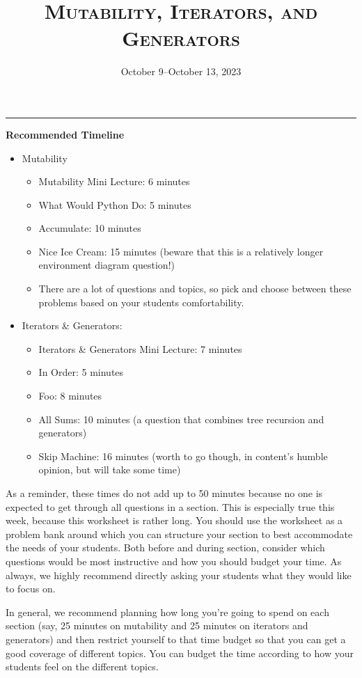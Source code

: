 \documentclass{exam}
\title{\textsc{Mutability, Iterators, and Generators}}
\date{October 9--October 13, 2023}
\begin{document}
\maketitle
\rule{\textwidth}{0.15em}


\begin{guide}
    \textbf{Recommended Timeline}
    \begin{itemize}
        \item Mutability
        \begin{itemize}
            \item Mutability Mini Lecture: 6 minutes
            \item What Would Python Do: 5 minutes
            \item Accumulate: 10 minutes
            \item Nice Ice Cream: 15 minutes (beware that this is a relatively longer environment diagram question!)
            \item There are a lot of questions and topics, so pick and choose between these problems based on your students comfortability.
        \end{itemize}
        \item Iterators \& Generators:
        \begin{itemize}
            \item Iterators \& Generators Mini Lecture: 7 minutes
            \item In Order: 5 minutes
            \item Foo: 8 minutes
            \item All Sums: 10 minutes (a question that combines tree recursion and generators)
            \item Skip Machine: 16 minutes (worth to go though, in content's humble opinion, but will take some time)
        \end{itemize}
    \end{itemize}

    As a reminder, these times do not add up to 50 minutes because no one is expected 
    to get through all questions in a section. This is especially true this week, 
    because this worksheet is rather long. You should use the worksheet as a problem bank
     around which you can structure your section to best accommodate the needs of your 
     students. Both before and during section, consider which questions would be most 
     instructive and how you should budget your time. As always, we highly recommend directly asking your students what they would like to focus on.
     
    In general, we recommend planning how long you're going to spend on each section (say, 25 minutes on mutability and 25 minutes on iterators and generators)
    and then restrict yourself to that time budget so that you can get a good coverage of different topics. You can budget the time according to how your students feel on the different topics.
\end{guide}
\end{document}
